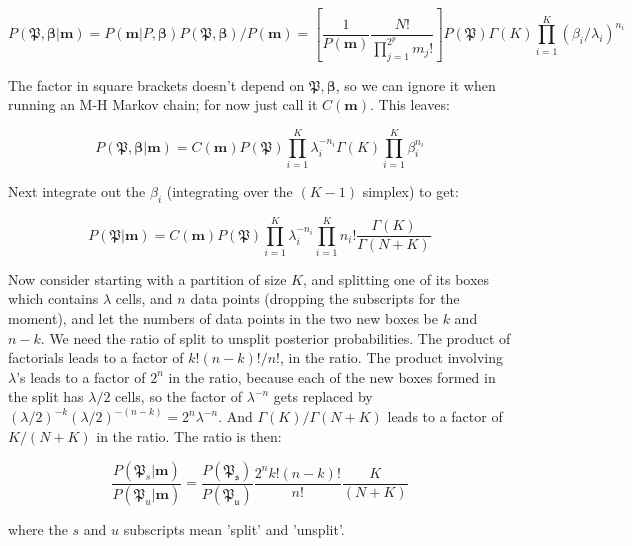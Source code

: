 \documentclass[14pt,english]{extarticle}
\def\Rho{P}
\begin{document}
$$  P(\mathfrak{P}, \boldsymbol{\beta}|\boldsymbol{m})
= P(\boldsymbol{m}|\Rho, \boldsymbol{\beta}) P(\mathfrak{P}, \boldsymbol{\beta}) / P(\boldsymbol{m}) 
= [\frac{1}{P(\boldsymbol{m})} \frac{N!}{\prod_{j=1}^{2^p}m_j!}] P(\mathfrak{P})  \Gamma(K) \prod_{i=1}^{K} ({\beta_{i}}/{\lambda_i})^{n_i} $$

The factor in square brackets doesn't depend on $\mathfrak{P},\boldsymbol{\beta}$, so we can ignore it when running an M-H Markov chain; for now just call it $C(\boldsymbol{m})$. This leaves:

$$ P(\mathfrak{P}, \boldsymbol{\beta}|\boldsymbol{m}) = C(\boldsymbol{m})  P(\mathfrak{P}) \prod_{i=1}^{K} \lambda_i^{-n_i} \Gamma(K) \prod_{i=1}^{K} \beta_{i}^{n_i} $$

Next integrate out the $\beta_i$ (integrating over the $(K-1)$ simplex) to get:

$$ P(\mathfrak{P}|\boldsymbol{m}) = C(\boldsymbol{m})  P(\mathfrak{P})  \prod_{i=1}^{K} \lambda_i^{-n_i}  \prod_{i=1}^{K} n_i! \frac{\Gamma(K)}{\Gamma (N + K) } $$

Now consider starting with a partition of size $K$, and splitting one of its boxes which contains $\lambda$ cells, and $n$ data points (dropping the subscripts for the moment), and let the numbers of data points in the two new boxes be $k$ and $n-k$. We need the ratio of split to unsplit posterior probabilities. The product of factorials leads to a factor of $k!(n-k)!/n!$, in the ratio. The product involving $\lambda$'s leads to a factor of $2^n$ in the ratio, because each of the new boxes formed in the split has $\lambda/2$ cells, so the factor of $\lambda^{-n}$ gets replaced by $(\lambda/2)^{-k} (\lambda/2)^{-(n-k)} = 2^n \lambda^{-n} $. And $\Gamma(K)/\Gamma(N+K)$ leads to a factor of $K/(N+K)$ in the ratio. The ratio is then:

$$ \frac{ P(\mathfrak{P}_s|\boldsymbol{m}) }{ P(\mathfrak{P}_u|\boldsymbol{m}) } =
\frac{ P(\mathfrak{P_s})}{ P(\mathfrak{P_u}) } \frac{2^{n} k!(n-k)!}{n!} \frac{K}{(N+K)} $$

where the $s$ and $u$ subscripts mean 'split' and 'unsplit'.

 
\end{document}
